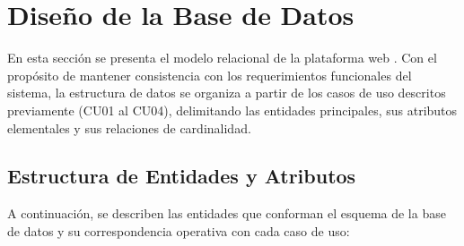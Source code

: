 \section{Diseño de la Base de Datos}
\label{sec:diseno_bd}

En esta sección se presenta el modelo relacional de la plataforma web \parencite{silberschatz2014}. Con el propósito de mantener consistencia con los requerimientos funcionales del sistema, la estructura de datos se organiza a partir de los casos de uso descritos previamente (CU01 al CU04), delimitando las entidades principales, sus atributos elementales y sus relaciones de cardinalidad.

\subsection{Estructura de Entidades y Atributos}
\label{subsec:tablas_atributos}

A continuación, se describen las entidades que conforman el esquema de la base de datos y su correspondencia operativa con cada caso de uso:

